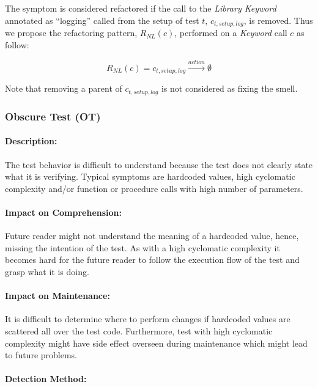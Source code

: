 The symptom is considered refactored if the call to the \emph{Library Keyword} annotated as ``logging'' called from the setup of test $t$, $c_{t, setup, log}$, is removed. Thus we propose the refactoring pattern, $R_{NL}(c)$, performed on a \emph{Keyword} call $c$ as follow:

\begin{equation*}
    R_{NL}(c) = c_{t, setup, log} \xrightarrow{action} \emptyset
\end{equation*}

Note that removing a parent of $c_{t, setup, log}$ is not considered as fixing the smell.


\subsubsection{Obscure Test (OT)}

\paragraph{Description:}

The test behavior is difficult to understand because the test does not clearly state what it is verifying. Typical symptoms are hardcoded values, high cyclomatic complexity and/or function or procedure calls with high number of parameters.

\paragraph{Impact on Comprehension:} Future reader might not understand the meaning of a hardcoded value, hence, missing the intention of the test. As with a high cyclomatic complexity it becomes hard for the future reader to follow the execution flow of the test and grasp what it is doing.

\paragraph{Impact on Maintenance:} It is difficult to determine where to perform changes if hardcoded values are scattered all over the test code. Furthermore, test with high cyclomatic complexity might have side effect overseen during maintenance which might lead to future problems.

\paragraph{Detection Method:}

